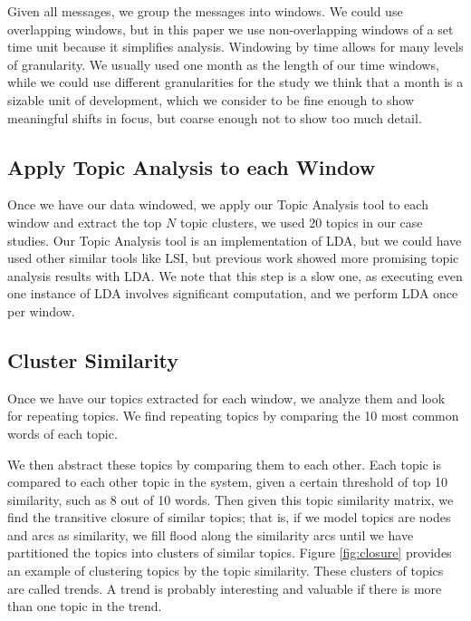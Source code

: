 \documentclass[times, 10pt,twocolumn]{article}
\begin{document}
Given all messages, we group the messages into windows. We could use
overlapping windows, but in this paper we use non-overlapping windows
of a set time unit because it simplifies analysis.  Windowing by time
allows for many levels of granularity. We usually used one month as
the length of our time windows, while we could use different
granularities for the study we think that a month is a sizable unit of
development, which we consider to be fine enough to show meaningful
shifts in focus, but coarse enough not to show too much detail.

\subsection{Apply Topic Analysis to each Window}

Once we have our data windowed, we apply our Topic Analysis tool to
each window and extract the top $N$ topic clusters, we used $20$
topics in our case studies. Our Topic Analysis tool is an
implementation of LDA, but we could have used other similar tools like
LSI, but previous work showed more promising topic analysis results
with LDA.  We note that this step is a slow one, as executing even one
instance of LDA involves significant computation, and we perform LDA
once per window.





\subsection{Cluster Similarity}


Once we have our topics extracted for each window, we analyze them and
look for repeating topics. We find repeating topics by comparing the
10 most common words of each topic.

We then abstract these topics by comparing them to each other.  Each
topic is compared to each other topic in the system, given a certain
threshold of top 10 similarity, such as 8 out of 10 words. Then given
this topic similarity matrix, we find the transitive closure of
similar topics; that is, if we model topics are nodes and arcs as
similarity, we fill flood along the similarity arcs until we have
partitioned the topics into clusters of similar topics. Figure
\ref{fig:closure} provides an example of clustering topics by the
topic similarity. These clusters of topics are called trends. A trend
is probably interesting and valuable if there is more than one topic
in the trend.
\end{document}
